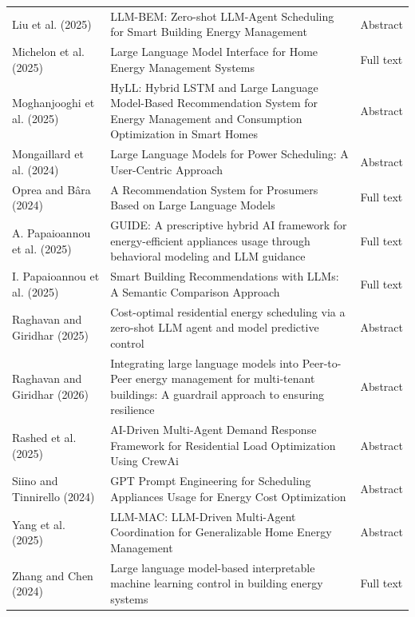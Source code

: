 \documentclass[12pt,a4paper]{report}
\begin{document}
{\begin{longtable}{>{\raggedright\arraybackslash}p{}>{\raggedright\arraybackslash}p{}>{\raggedright\arraybackslash}p{}}
Liu et al. (2025) & LLM-BEM: Zero-shot LLM-Agent Scheduling for Smart Building Energy Management & Abstract \\[3pt]
Michelon et al. (2025) & Large Language Model Interface for Home Energy Management Systems & Full text \\[3pt]
Moghanjooghi et al. (2025) & HyLL: Hybrid LSTM and Large Language Model-Based Recommendation System for Energy Management and Consumption Optimization in Smart Homes & Abstract \\[3pt]
Mongaillard et al. (2024) & Large Language Models for Power Scheduling: A User-Centric Approach & Abstract \\[3pt]
Oprea and Bâra (2024) & A Recommendation System for Prosumers Based on Large Language Models & Full text \\[3pt]
A. Papaioannou et al. (2025) & GUIDE: A prescriptive hybrid AI framework for energy-efficient appliances usage through behavioral modeling and LLM guidance & Full text \\[3pt]
I. Papaioannou et al. (2025) & Smart Building Recommendations with LLMs: A Semantic Comparison Approach & Full text \\[3pt]
Raghavan and Giridhar (2025) & Cost-optimal residential energy scheduling via a zero-shot LLM agent and model predictive control & Abstract \\[3pt]
Raghavan and Giridhar (2026) & Integrating large language models into Peer-to-Peer energy management for multi-tenant buildings: A guardrail approach to ensuring resilience & Abstract \\[3pt]
Rashed et al. (2025) & AI-Driven Multi-Agent Demand Response Framework for Residential Load Optimization Using CrewAi & Abstract \\[3pt]
Siino and Tinnirello (2024) & GPT Prompt Engineering for Scheduling Appliances Usage for Energy Cost Optimization & Abstract \\[3pt]
Yang et al. (2025) & LLM-MAC: LLM-Driven Multi-Agent Coordination for Generalizable Home Energy Management & Abstract \\[3pt]
Zhang and Chen (2024) & Large language model-based interpretable machine learning control in building energy systems & Full text \\[3pt]
\end{longtable}

}
\end{document}
